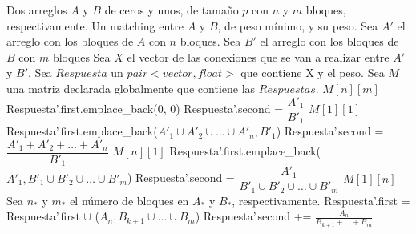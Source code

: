 \documentclass[12pt,a4,paper]{article}
\begin{document}
\begin{algorithmic}[1]
    \REQUIRE Dos arreglos $A$ y $B$ de ceros y unos, de tamaño $p$ con $n$ y $m$ bloques, respectivamente.
    \ENSURE Un matching entre $A$ y $B$, de peso mínimo, y su peso. \newline \newline
        \STATE Sea $A'$ el arreglo con los bloques de $A$ con $n$ bloques.
        \STATE Sea $B'$ el arreglo con los bloques de $B$ con $m$ bloques
        \STATE Sea $X$ el vector de las conexiones que se van a realizar entre $A'$ y $B'$.
        \STATE Sea $Respuesta$ un $pair<vector, float>$ que contiene X y el peso.
        \STATE Sea $M$ una matriz declarada globalmente que contiene las $Respuestas$.
            \RETURN $M[n][m]$
        \ENDIF
        \STATE
                \STATE Respuesta'.first.emplace\_back(0, 0)
                \STATE Respuesta'.second = $\dfrac{A'_1}{B'_1}$
            \ENDIF
            \RETURN $M[1][1]$
        \ENDIF
        \STATE
                \STATE Respuesta'.first.emplace\_back($A'_1\cup A'_2\cup \ldots \cup A'_n, B'_1$)
                \STATE Respuesta'.second = $\dfrac{A'_1+A'_2+\ldots +A'_n}{B'_1}$
            \ENDIF
            \RETURN $M[n][1]$
        \ENDIF
        \STATE
                \STATE Respuesta'.first.emplace\_back($A'_1, B'_1\cup B'_2\cup \ldots \cup B'_m$)
                \STATE Respuesta'.second = $\dfrac{A'_1}{B'_1\cup B'_2\cup \ldots \cup B'_m}$
            \ENDIF
            \RETURN $M[1][n]$
        \ENDIF
        \STATE
         
             
            \STATE Sea $n_*$ y $m_*$ el número de bloques en $A_*$ y $B_*$, respectivamente.
                \STATE Respuesta'.first = Respuesta'.first $\cup$ ($A_n, B_{k+1}\cup \ldots\cup B_m$)
                \STATE Respuesta'.second += $\frac{A_n}{B_{k+1}+\ldots+B_m}$
            \ELSE

\end{algorithmic}
\end{document}
